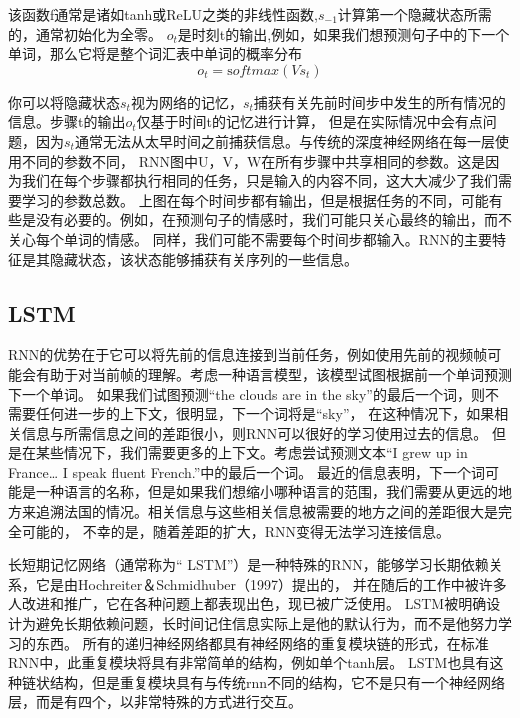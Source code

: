 该函数f通常是诸如tanh或ReLU之类的非线性函数,$s_{-1}$计算第一个隐藏状态所需的，通常初始化为全零。
$o_{t}$是时刻t的输出,例如，如果我们想预测句子中的下一个单词，那么它将是整个词汇表中单词的概率分布
\begin{equation}
  o_t = \mathrm softmax (V s_t)
  \end{equation}

  你可以将隐藏状态$s_{t}$视为网络的记忆，$s_{t}$捕获有关先前时间步中发生的所有情况的信息。步骤t的输出$o_{t}$仅基于时间t的记忆进行计算，
  但是在实际情况中会有点问题，因为$s_{t}$通常无法从太早时间之前捕获信息。与传统的深度神经网络在每一层使用不同的参数不同，
  RNN图中U，V，W在所有步骤中共享相同的参数。这是因为我们在每个步骤都执行相同的任务，只是输入的内容不同，这大大减少了我们需要学习的参数总数。
  上图在每个时间步都有输出，但是根据任务的不同，可能有些是没有必要的。例如，在预测句子的情感时，我们可能只关心最终的输出，而不关心每个单词的情感。
  同样，我们可能不需要每个时间步都输入。RNN的主要特征是其隐藏状态，该状态能够捕获有关序列的一些信息。


  
  \subsection{LSTM}
  RNN的优势在于它可以将先前的信息连接到当前任务，例如使用先前的视频帧可能会有助于对当前帧的理解。考虑一种语言模型，该模型试图根据前一个单词预测下一个单词。
  如果我们试图预测“the clouds are in the sky”的最后一个词，则不需要任何进一步的上下文，很明显，下一个词将是“sky”，
  在这种情况下，如果相关信息与所需信息之间的差距很小，则RNN可以很好的学习使用过去的信息。
  但是在某些情况下，我们需要更多的上下文。考虑尝试预测文本“I grew up in France… I speak fluent French.”中的最后一个词。
  最近的信息表明，下一个词可能是一种语言的名称，但是如果我们想缩小哪种语言的范围，我们需要从更远的地方来追溯法国的情况。相关信息与这些相关信息被需要的地方之间的差距很大是完全可能的，
不幸的是，随着差距的扩大，RNN变得无法学习连接信息。

长短期记忆网络（通常称为“ LSTM”）是一种特殊的RNN，能够学习长期依赖关系，它是由Hochreiter＆Schmidhuber（1997）提出的，
并在随后的工作中被许多人改进和推广，它在各种问题上都表现出色，现已被广泛使用。
LSTM被明确设计为避免长期依赖问题，长时间记住信息实际上是他的默认行为，而不是他努力学习的东西。
所有的递归神经网络都具有神经网络的重复模块链的形式，在标准RNN中，此重复模块将具有非常简单的结构，例如单个tanh层。
LSTM也具有这种链状结构，但是重复模块具有与传统rnn不同的结构，它不是只有一个神经网络层，而是有四个，以非常特殊的方式进行交互。

